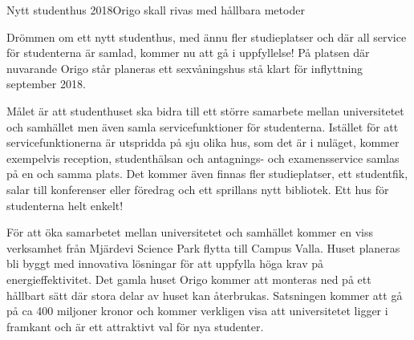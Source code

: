 \begin{news}{2}{Nytt studenthus 2018}{Origo skall rivas med hållbara metoder}{}{}

Drömmen om ett nytt studenthus, med ännu fler studieplatser och där
all service för studenterna är samlad, kommer nu att gå i
uppfyllelse! På platsen där nuvarande Origo står planeras ett
sexvåningshus stå klart för inflyttning september 2018.


Målet är att studenthuset ska bidra till ett större samarbete mellan
universitetet och samhället men även samla servicefunktioner för
studenterna. Istället för att servicefunktionerna är utspridda på sju
olika hus, som det är i nuläget, kommer exempelvis reception,
studenthälsan och antagnings- och examensservice samlas på en och
samma plats. Det kommer även finnas fler studieplatser, ett
studentfik, salar till konferenser eller föredrag och ett sprillans
nytt bibliotek. Ett hus för studenterna helt enkelt!

För att öka samarbetet mellan universitetet och samhället kommer en
viss verksamhet från Mjärdevi Science Park flytta till Campus
Valla. Huset planeras bli byggt med innovativa lösningar för att
uppfylla höga krav på energieffektivitet. Det gamla huset Origo kommer
att monteras ned på ett hållbart sätt där stora delar av huset kan
återbrukas. Satsningen kommer att gå på ca 400 miljoner kronor och
kommer verkligen visa att universitetet ligger i framkant och är ett
attraktivt val för nya studenter.



\end{news}
